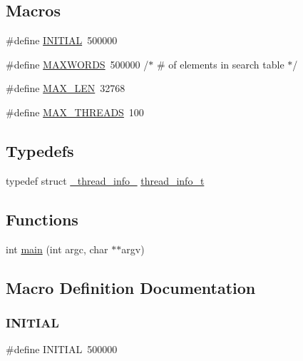 \subsection*{Macros}
\begin{DoxyCompactItemize}
\item 
\#define \mbox{\hyperlink{tread-th_8c_aa3d063564f6ab16f6d408b8369d0e9ff}{I\+N\+I\+T\+I\+AL}}~500000
\item 
\#define \mbox{\hyperlink{tread-th_8c_aa6b319146daf33409da1bbe4194553dc}{M\+A\+X\+W\+O\+R\+DS}}~500000	       /$\ast$ \# of elements in search table $\ast$/
\item 
\#define \mbox{\hyperlink{tread-th_8c_aabf4f709c8199e41cf279c77112345fe}{M\+A\+X\+\_\+\+L\+EN}}~32768
\item 
\#define \mbox{\hyperlink{tread-th_8c_a8b5173357adb02a86c027316e0acdfa0}{M\+A\+X\+\_\+\+T\+H\+R\+E\+A\+DS}}~100
\end{DoxyCompactItemize}
\subsection*{Typedefs}
\begin{DoxyCompactItemize}
\item 
typedef struct \mbox{\hyperlink{struct__thread__info__}{\+\_\+thread\+\_\+info\+\_\+}} \mbox{\hyperlink{tread-th_8c_a9b5e9da8d3952d6ccc173282d0a5fcf8}{thread\+\_\+info\+\_\+t}}
\end{DoxyCompactItemize}
\subsection*{Functions}
\begin{DoxyCompactItemize}
\item 
int \mbox{\hyperlink{tread-th_8c_a3c04138a5bfe5d72780bb7e82a18e627}{main}} (int argc, char $\ast$$\ast$argv)
\end{DoxyCompactItemize}


\subsection{Macro Definition Documentation}
\mbox{\label{tread-th_8c_aa3d063564f6ab16f6d408b8369d0e9ff}} 
\subsubsection{\texorpdfstring{INITIAL}{INITIAL}}
{\footnotesize\ttfamily \#define I\+N\+I\+T\+I\+AL~500000}

